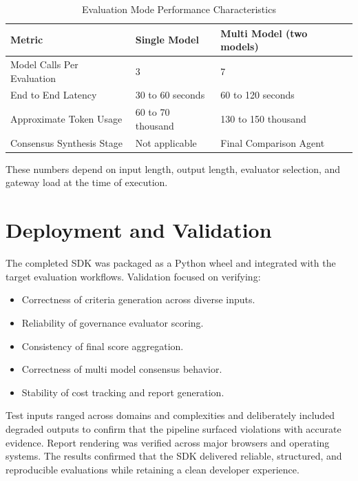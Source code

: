 \documentclass[12pt, a4paper, oneside]{report}
\begin{document}
\begin{table}[h]
\centering
\caption{Evaluation Mode Performance Characteristics}
\label{tab:performance}
\begin{tabular}{|p{4cm}|p{5cm}|p{5cm}|}
\hline
\textbf{Metric} & \textbf{Single Model} & \textbf{Multi Model (two models)} \\
\hline
Model Calls Per Evaluation & 3 & 7 \\
\hline
End to End Latency & 30 to 60 seconds & 60 to 120 seconds \\
\hline
Approximate Token Usage & 60 to 70 thousand & 130 to 150 thousand \\
\hline
Consensus Synthesis Stage & Not applicable & Final Comparison Agent \\
\hline
\end{tabular}
\end{table}

These numbers depend on input length, output length, evaluator selection, and gateway load at the time of execution.

\section{Deployment and Validation}

The completed SDK was packaged as a Python wheel and integrated with the target evaluation workflows. Validation focused on verifying:

\begin{itemize}
    \item Correctness of criteria generation across diverse inputs.
    \item Reliability of governance evaluator scoring.
    \item Consistency of final score aggregation.
    \item Correctness of multi model consensus behavior.
    \item Stability of cost tracking and report generation.
\end{itemize}

Test inputs ranged across domains and complexities and deliberately included degraded outputs to confirm that the pipeline surfaced violations with accurate evidence. Report rendering was verified across major browsers and operating systems. The results confirmed that the SDK delivered reliable, structured, and reproducible evaluations while retaining a clean developer experience.

\end{document}
